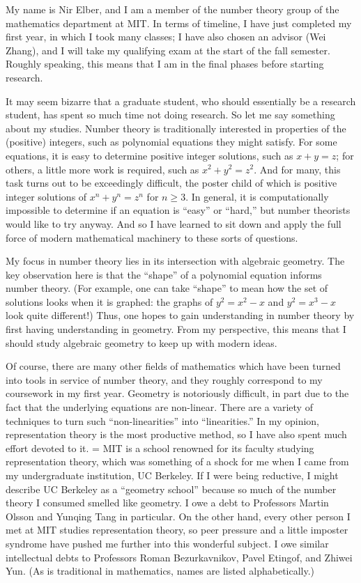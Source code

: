\documentclass{article}
\begin{document}
My name is Nir Elber, and I am a member of the number theory group of the mathematics department at MIT. In terms of timeline, I have just completed my first year, in which I took many classes; I have also chosen an advisor (Wei Zhang), and I will take my qualifying exam at the start of the fall semester. Roughly speaking, this means that I am in the final phases before starting research.

It may seem bizarre that a graduate student, who should essentially be a research student, has spent so much time not doing research. So let me say something about my studies. Number theory is traditionally interested in properties of the (positive) integers, such as polynomial equations they might satisfy. For some equations, it is easy to determine positive integer solutions, such as $x+y=z$; for others, a little more work is required, such as $x^2+y^2=z^2$. And for many, this task turns out to be exceedingly difficult, the poster child of which is positive integer solutions of $x^n+y^n=z^n$ for $n\ge3$. In general, it is computationally impossible to determine if an equation is ``easy'' or ``hard,'' but number theorists would like to try anyway. And so I have learned to sit down and apply the full force of modern mathematical machinery to these sorts of questions.

My focus in number theory lies in its intersection with algebraic geometry. The key observation here is that the ``shape'' of a polynomial equation informs number theory. (For example, one can take ``shape'' to mean how the set of solutions looks when it is graphed: the graphs of $y^2=x^2-x$ and $y^2=x^3-x$ look quite different!) Thus, one hopes to gain understanding in number theory by first having understanding in geometry. From my perspective, this means that I should study algebraic geometry to keep up with modern ideas.

Of course, there are many other fields of mathematics which have been turned into tools in service of number theory, and they roughly correspond to my coursework in my first year. Geometry is notoriously difficult, in part due to the fact that the underlying equations are non-linear. There are a variety of techniques to turn such ``non-linearities'' into ``linearities.'' In my opinion, representation theory is the most productive method, so I have also spent much effort devoted to it.
=
MIT is a school renowned for its faculty studying representation theory, which was something of a shock for me when I came from my undergraduate institution, UC Berkeley. If I were being reductive, I might describe UC Berkeley as a ``geometry school'' because so much of the number theory I consumed smelled like geometry. I owe a debt to Professors Martin Olsson and Yunqing Tang in particular. On the other hand, every other person I met at MIT studies representation theory, so peer pressure and a little imposter syndrome have pushed me further into this wonderful subject. I owe similar intellectual debts to Professors Roman Bezurkavnikov, Pavel Etingof, and Zhiwei Yun. (As is traditional in mathematics, names are listed alphabetically.)
\end{document}

